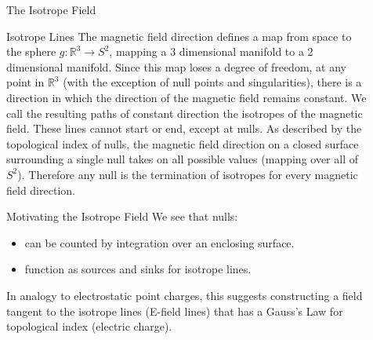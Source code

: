 \documentclass[final]{beamer}
\newlength{\sepwid}
\newlength{\onecolwid}
\begin{document}
\begin{frame}[t]
\begin{columns}[t]
\begin{column}{\onecolwid}

\end{column} %


\begin{column}{\sepwid}\end{column} %

\begin{column}{\onecolwid} %


%

\begin{block}{\huge{The Isotrope Field}}
\begin{block}{Isotrope Lines}
  The magnetic field direction defines a map from space to the sphere $g:\mathbb{R}^3\rightarrow S^2$,
  mapping a 3 dimensional manifold to a 2 dimensional manifold.
  Since this map loses a degree of freedom,
  at any point in $\mathbb{R}^3$ (with the exception of null points and singularities),
  there is a direction in which the direction
  of the magnetic field remains constant.
  We call the resulting paths of constant direction the isotropes of the magnetic field.
  These lines cannot start or end, except at nulls.
  As described by the topological index of nulls, the magnetic field direction
  on a closed surface surrounding a single null takes on all possible values (mapping over all of $S^2$).
  Therefore any null is the termination of isotropes for every magnetic field direction.
\end{block}

\begin{block}{Motivating the Isotrope Field}
  We see that nulls:
  \begin{itemize}
  \item can be counted by integration over an enclosing surface.
  \item function as sources and sinks for isotrope lines.
  \end{itemize}
  In analogy to electrostatic point charges,
  this suggests constructing a field tangent to the isotrope lines (E-field lines)
  that has a Gauss's Law for topological index (electric charge).
\end{block}


\end{block}
\end{column}
\end{columns}
\end{frame}
\end{document}
